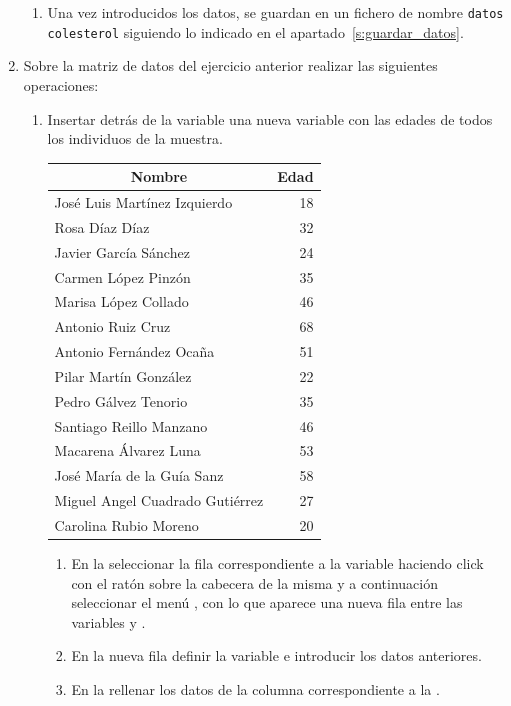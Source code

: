 \begin{enumerate}[leftmargin=*]
\begin{indicacion}
\begin{enumerate}
\item Una vez introducidos los datos, se guardan en un fichero de nombre \texttt{datos colesterol}
siguiendo lo indicado en el apartado~\ref{s:guardar_datos}.
\end{enumerate}
\end{indicacion}


\item Sobre la matriz de datos del ejercicio anterior realizar las siguientes operaciones:

\begin{enumerate}
\item Insertar detrás de la variable  una nueva variable  con las edades
de todos los individuos de la muestra.
\begin{center}
\begin{tabular}{|l|r|}
\hline
\multicolumn{1}{|c|}{Nombre} & \multicolumn{1}{c|}{Edad} \\
\hline
José Luis Martínez Izquierdo & 18 \\
Rosa Díaz Díaz & 32 \\
Javier García Sánchez & 24 \\
Carmen López Pinzón & 35 \\
Marisa López Collado & 46 \\
Antonio Ruiz Cruz & 68 \\
Antonio Fernández Ocaña & 51 \\
Pilar Martín González & 22 \\
Pedro Gálvez Tenorio & 35 \\
Santiago Reillo Manzano & 46 \\
Macarena Álvarez Luna & 53 \\
José María de la Guía Sanz & 58 \\
Miguel Angel Cuadrado Gutiérrez & 27 \\
Carolina Rubio Moreno & 20 \\
\hline
\end{tabular}
\end{center}

\begin{indicacion}
\begin{enumerate}
\item En la  seleccionar la fila correspondiente a la variable  haciendo click con el ratón sobre
la cabecera de la misma y a continuación seleccionar el menú , con lo que aparece una
nueva fila entre las variables  y .
\item En la nueva fila definir la variable  e introducir los datos anteriores.
\item En la  rellenar los datos de la columna correspondiente a la .
\end{enumerate}
\end{indicacion}


\end{enumerate}
\end{enumerate}
